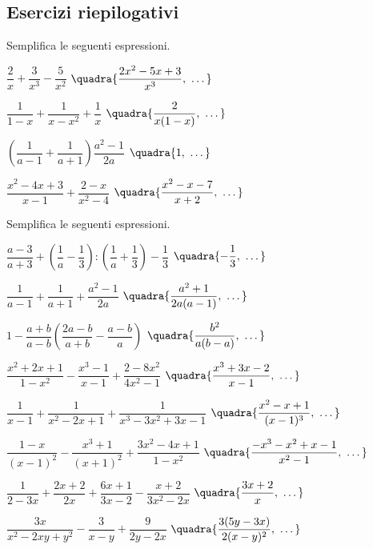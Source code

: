 
\subsection*{Esercizi riepilogativi}

\begin{esercizio}[\Ast]
\label{ese:19.31}
Semplifica le seguenti espressioni.
\begin{multicols}{2}
\begin{enumeratea}
 \item \(\dfrac{2}{x}+\dfrac{3}{x^{3}}-\dfrac{5}{x^{2}}\)
  \hfill {\footnotesize \(\quadra{\dfrac{2x^{2}-5x+3}{x^{3}},~\dots}\)}
 \item \(\dfrac{1}{1-x}+\dfrac{1}{x-x^{2}}+\dfrac{1}{x}\)
  \hfill {\footnotesize \(\quadra{\dfrac{2}{x(1-x)},~\dots}\)}
 \item \(\left(\dfrac{1}{a-1}+\dfrac{1}{a+1}\right)\dfrac{a^{2}-1}{2a}\)
  \hfill {\footnotesize \(\quadra{1,~\dots}\)}
 \item \(\dfrac{x^{2}-4x+3}{x-1}+\dfrac{2-x}{x^{2}-4}\)
  \hfill {\footnotesize \(\quadra{\dfrac{x^{2}-x-7}{x+2},~\dots}\)}
\end{enumeratea}
\end{multicols}
\end{esercizio}

\begin{esercizio}[\Ast]
Semplifica le seguenti espressioni.
\begin{enumeratea}
 \item \(\dfrac{a-3}{a+3}+\left(\dfrac{1}{a}-\dfrac{1}{3}\right):
        \left(\dfrac{1}{a}+\dfrac{1}{3}\right)-\dfrac{1}{3}\)
  \hfill {\footnotesize \(\quadra{-{\dfrac{1}{3}},~\dots}\)}
 \item \(\dfrac{1}{a-1}+\dfrac{1}{a+1}+\dfrac{a^{2}-1}{2a}\)
  \hfill {\footnotesize \(\quadra{\dfrac{a^{2}+1}{2a(a-1)},~\dots}\)}
 \item \(1-\dfrac{a+b}{a-b} \left(\dfrac{2a-b}{a+b}-\dfrac{a-b}{a}\right)\)
  \hfill {\footnotesize \(\quadra{\dfrac{b^{2}}{a(b-a)},~\dots}\)}
 \item \(\dfrac{x^{2}+2x+1}{1-x^{2}}-\dfrac{x^{3}-1}{x-1}+
        \dfrac{2-8x^{2}}{4x^{2}-1}\)
  \hfill {\footnotesize \(\quadra{\dfrac{x^{3}+3x-2}{x-1},~\dots}\)}
 \item \(\dfrac{1}{x-1}+\dfrac{1}{x^{2}-2x+1}+\dfrac{1}{x^{3}-3x^{2}+3x-1}\)
  \hfill {\footnotesize \(\quadra{\dfrac{x^{2}-x+1}{(x-1)^{3}},~\dots}\)}
 \item \(\dfrac{1-x}{(x-1)^{2}}-\dfrac{x^{3}+1}{(x+1)^{2}}+
        \dfrac{3x^{2}-4x+1}{1-x^{2}}\)
  \hfill {\footnotesize \(\quadra{\dfrac{-x^{3}-x^{2}+x-1}{x^{2}-1},~
    \dots}\)}
 \item \(\dfrac{1}{2-3x}+\dfrac{2x+2}{2x}+\dfrac{6x+1}{3x-2}-
        \dfrac{x+2}{3x^{2}-2x}\)
  \hfill {\footnotesize \(\quadra{\dfrac{3x+2}{x},~\dots}\)}
 \item \(\dfrac{3x}{x^{2}-2xy+y^{2}}-\dfrac{3}{x-y}+\dfrac{9}{2y-2x}\)
  \hfill {\footnotesize \(\quadra{\dfrac{3(5y-3x)}{2(x-y)^{2}},~\dots}\)}
\end{enumeratea}
\end{esercizio}

